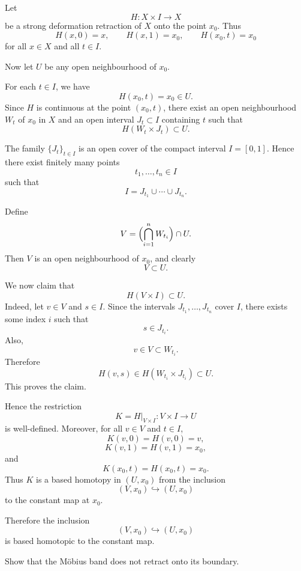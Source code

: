 \begin{solution}
Let
\[
H:X\times I\to X
\]
be a strong deformation retraction of \(X\) onto the point \(x_0\). Thus
\[
H(x,0)=x,
\qquad
H(x,1)=x_0,
\qquad
H(x_0,t)=x_0
\]
for all \(x\in X\) and all \(t\in I\).

Now let \(U\) be any open neighbourhood of \(x_0\).

For each \(t\in I\), we have
\[
H(x_0,t)=x_0\in U.
\]
Since \(H\) is continuous at the point \((x_0,t)\), there exist an open neighbourhood \(W_t\) of \(x_0\) in \(X\) and an open interval \(J_t\subset I\) containing \(t\) such that
\[
H(W_t\times J_t)\subset U.
\]

The family \(\{J_t\}_{t\in I}\) is an open cover of the compact interval \(I=[0,1]\). Hence there exist finitely many points
\[
t_1,\dots,t_n\in I
\]
such that
\[
I=J_{t_1}\cup\cdots\cup J_{t_n}.
\]

Define
\[
V=\Bigl(\bigcap_{i=1}^n W_{t_i}\Bigr)\cap U.
\]
Then \(V\) is an open neighbourhood of \(x_0\), and clearly
\[
V\subset U.
\]

We now claim that
\[
H(V\times I)\subset U.
\]
Indeed, let \(v\in V\) and \(s\in I\). Since the intervals \(J_{t_1},\dots,J_{t_n}\) cover \(I\), there exists some index \(i\) such that
\[
s\in J_{t_i}.
\]
Also,
\[
v\in V\subset W_{t_i}.
\]
Therefore
\[
H(v,s)\in H(W_{t_i}\times J_{t_i})\subset U.
\]
This proves the claim.

Hence the restriction
\[
K=H|_{V\times I}:V\times I\to U
\]
is well-defined. Moreover, for all \(v\in V\) and \(t\in I\),
\[
K(v,0)=H(v,0)=v,
\]
\[
K(v,1)=H(v,1)=x_0,
\]
and
\[
K(x_0,t)=H(x_0,t)=x_0.
\]
Thus \(K\) is a based homotopy in \((U,x_0)\) from the inclusion
\[
(V,x_0)\hookrightarrow (U,x_0)
\]
to the constant map at \(x_0\).

Therefore the inclusion
\[
(V,x_0)\hookrightarrow (U,x_0)
\]
is based homotopic to the constant map.
\end{solution}

\begin{problem}
Show that the Möbius band does not retract onto its boundary.
\end{problem}

